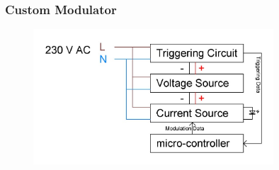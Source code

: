 \documentclass{beamer}
\begin{document}



	\begin{frame}\frametitle{Custom Modulator}
		\begin{figure}
			\centering
			\includegraphics[width=0.8\textwidth]{../chapters/hardware-chapters/AC/ac-modulator/custom-hardware/ac-modulator-architectural.JPG}
		\end{figure}
	\end{frame}








\end{document}
